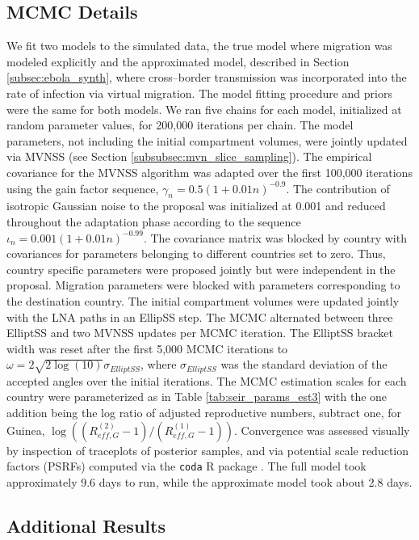 \newpage
\subsection{MCMC Details}
\label{subsec:ebola_synth_mcmc}
We fit two models to the simulated data, the true model where migration was modeled explicitly and the approximated model, described in Section \ref{subsec:ebola_synth}, where cross--border transmission was incorporated into the rate of infection via virtual migration. The model fitting procedure and priors were the same for both models. We ran five chains for each model, initialized at random parameter values, for 200,000 iterations per chain. The model parameters, not including the initial compartment volumes, were jointly updated via MVNSS (see Section \ref{subsubsec:mvn_slice_sampling}). The empirical covariance for the MVNSS algorithm was adapted over the first 100,000 iterations using the gain factor sequence, $\gamma_n = 0.5(1 + 0.01n)^{-0.9}$. The contribution of isotropic Gaussian noise to the proposal was initialized at 0.001 and reduced throughout the adaptation phase according to the sequence $ \iota_n = 0.001(1 + 0.01n)^{-0.99} $. The covariance matrix was blocked by country with covariances for parameters belonging to different countries set to zero. Thus, country specific parameters were proposed jointly but were independent in the proposal. Migration parameters were blocked with parameters corresponding to the destination country. The initial compartment volumes were updated jointly with the LNA paths in an EllipSS step. The MCMC alternated between three ElliptSS and two MVNSS updates per MCMC iteration. The ElliptSS bracket width was reset after the first 5,000 MCMC iterations to $ \omega = 2\sqrt{2\log(10)}\sigma_{ElliptSS}$, where $ \sigma_{ElliptSS} $ was the standard deviation of the accepted angles over the initial iterations. The MCMC estimation scales for each country were parameterized as in Table \ref{tab:seir_params_est3} with the one addition being the log ratio of adjusted reproductive numbers, subtract one, for Guinea, $ \log\left ((R_{eff,G}^{(2)}-1)/(R_{eff,G}^{(1)}-1)\right ) $. Convergence was assessed visually by inspection of traceplots of posterior samples, and via potential scale reduction factors (PSRFs) \cite{brooks1998general} computed via the \texttt{coda} R package \cite{codapackage}. The full model took approximately 9.6 days to run, while the approximate model took about 2.8 days. 

\subsection{Additional Results}
\label{subsec:ebola_synth_supplement}

